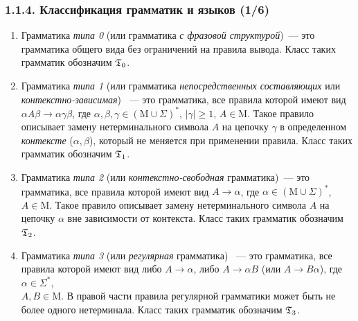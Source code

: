\documentclass[mathserif,12pt,aspectratio=169]{beamer}
\renewcommand{\index}[1]{}
\def\odmkey#1#2{{\it\color{red} #1}\index{#2}}
\let\geq\geqslant
\begin{document}
\begin{frame}
\frametitle{1.1.4. Классификация грамматик и языков (1/6)}

\begin{enumerate}
\item Грамматика \odmkey{типа 0}{Грамматика!типа 0}
(или грамматика \odmkey{с фразовой структурой}{Грамматика!с
фразовой структурой})~--- это грамматика общего вида без
ограничений на правила вывода. Класс таких грамматик обозначим
$\frak{T}_0$.
\item Грамматика \odmkey{типа 1}{Грамматика!типа 1}
(или грамматика \odmkey{непосредственных
составляющих}{Грамматика!непосредственных составляющих} или
\odmkey{контекст\-но-зависимая}{Грамматика!контекстно-зависимая})
~--- это грамматика, все правила которой имеют вид $\alpha
A\beta\rightarrow\alpha\gamma\beta$, где $\alpha,\beta, \gamma\in (\mathrm{M}\cup
\Sigma)^*$, $|\gamma|\geq 1$, $A\in \mathrm{M}$. Такое правило описывает замену
нетерминального символа $A$ на цепочку $\gamma$ в определенном
\odmkey{контексте}{Контекст!правила} ($\alpha,\beta$), который не
меняется при применении правила. Класс таких грамматик обозначим
$\frak{T}_1$.
\item Грамматика \odmkey{типа 2}{Грамматика!типа 2}
(или
\odmkey{контекстно-свободная}{Грамматика!контекстно-свободная}
грамматика)~---  это грамматика, все правила которой имеют вид
$A\rightarrow\alpha$, где $\alpha\in (\mathrm{M}\cup \Sigma)^*$, $A\in \mathrm{M}$. Такое
правило описывает замену нетерминального символа $A$ на цепочку
$\alpha$ вне зависимости от контекста. Класс таких грамматик
обозначим $\frak{T}_2$.
\item Грамматика \odmkey{типа 3}{Грамматика!типа 3}
(или \odmkey{регулярная}{Грамматика!регулярная} грамматика) ~---
это грамматика, все правила которой имеют вид либо
$A\rightarrow\alpha$, либо $A\rightarrow\alpha B$ (или
$A\rightarrow B\alpha$), где $\alpha\in \Sigma^*$,\\ $A,B\in \mathrm{M}$.
В правой части правила регулярной грамматики может быть не более
одного нетерминала.
Класс таких грамматик обозначим
$\frak{T}_3$.
\end{enumerate}
\end{frame}
\end{document}
